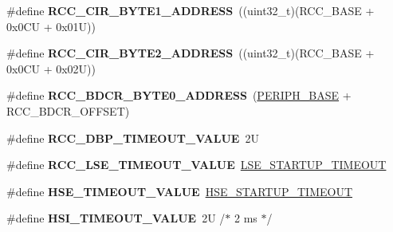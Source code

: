 \begin{DoxyCompactItemize}
\#define {\bfseries R\+C\+C\+\_\+\+C\+I\+R\+\_\+\+B\+Y\+T\+E1\+\_\+\+A\+D\+D\+R\+E\+SS}~((uint32\+\_\+t)(R\+C\+C\+\_\+\+B\+A\+SE + 0x0\+C\+U + 0x01\+U))
\item 
\mbox{\label{group___r_c_c___bit_address___alias_region_ga1387fb2dfadb830eb83ab2772c8d2294}} 
\#define {\bfseries R\+C\+C\+\_\+\+C\+I\+R\+\_\+\+B\+Y\+T\+E2\+\_\+\+A\+D\+D\+R\+E\+SS}~((uint32\+\_\+t)(R\+C\+C\+\_\+\+B\+A\+SE + 0x0\+C\+U + 0x02\+U))
\item 
\mbox{\label{group___r_c_c___bit_address___alias_region_ga12a7b221df58454d4c59e1d3109b72f2}} 
\#define {\bfseries R\+C\+C\+\_\+\+B\+D\+C\+R\+\_\+\+B\+Y\+T\+E0\+\_\+\+A\+D\+D\+R\+E\+SS}~(\mbox{\hyperlink{group___peripheral__memory__map_ga9171f49478fa86d932f89e78e73b88b0}{P\+E\+R\+I\+P\+H\+\_\+\+B\+A\+SE}} + R\+C\+C\+\_\+\+B\+D\+C\+R\+\_\+\+O\+F\+F\+S\+ET)
\item 
\mbox{\label{group___r_c_c___bit_address___alias_region_gae578b5efd6bd38193ab426ce65cb77b1}} 
\#define {\bfseries R\+C\+C\+\_\+\+D\+B\+P\+\_\+\+T\+I\+M\+E\+O\+U\+T\+\_\+\+V\+A\+L\+UE}~2U
\item 
\mbox{\label{group___r_c_c___bit_address___alias_region_gafe8ed1c0ca0e1c17ea69e09391498cc7}} 
\#define {\bfseries R\+C\+C\+\_\+\+L\+S\+E\+\_\+\+T\+I\+M\+E\+O\+U\+T\+\_\+\+V\+A\+L\+UE}~\mbox{\hyperlink{stm32f4xx__hal__conf_8h_a85e6fc812dc26f7161a04be2568a5462}{L\+S\+E\+\_\+\+S\+T\+A\+R\+T\+U\+P\+\_\+\+T\+I\+M\+E\+O\+UT}}
\item 
\mbox{\label{group___r_c_c___bit_address___alias_region_gac0cd4ed24fa948844e1a40b12c450f32}} 
\#define {\bfseries H\+S\+E\+\_\+\+T\+I\+M\+E\+O\+U\+T\+\_\+\+V\+A\+L\+UE}~\mbox{\hyperlink{stm32f4xx__hal__conf_8h_a68ecbc9b0a1a40a1ec9d18d5e9747c4f}{H\+S\+E\+\_\+\+S\+T\+A\+R\+T\+U\+P\+\_\+\+T\+I\+M\+E\+O\+UT}}
\item 
\mbox{\label{group___r_c_c___bit_address___alias_region_gad9e56670dcbbe9dbc3a8971b36bbec58}} 
\#define {\bfseries H\+S\+I\+\_\+\+T\+I\+M\+E\+O\+U\+T\+\_\+\+V\+A\+L\+UE}~2\+U  /$\ast$ 2 ms $\ast$/
\item 

\end{DoxyCompactItemize}
